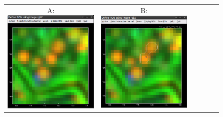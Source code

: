 \begin{figure}[!ht]
\centering
\begin{tabular}{cccccc}
A: \includegraphics[scale=0.23]{figs3/LANS-roi-interactive0}
&
B: \includegraphics[scale=0.23]{figs3/LANS-roi-interactive1}

\end{tabular}
\end{figure}
